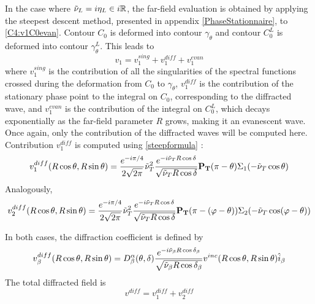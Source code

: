 In the case where $\tilde{\nu}_L=i\eta_L \in i\mathbb{R}$, the far-field evaluation is obtained by applying the steepest descent method, presented in appendix \ref{PhaseStationnaire}, to \eqref{C4:v1C0evan}. Contour $C_0$ is deformed into contour $\gamma_{\theta}$ and contour $C_0^L$ is deformed into contour $\gamma_{\theta}^L$. This leads to
\begin{equation}
v_1=v_1^{sing}+v_1^{diff}+v_1^{evan}
\end{equation}
where $v_1^{sing}$ is the contribution of all the singularities of the spectral functions crossed during the deformation from $C_0$ to $\gamma_{\theta}$, $v_1^{diff}$ is the contribution of the stationary phase point to the integral on $C_0$, corresponding to the diffracted wave, and $v_1^{evan}$ is the contribution of the integral on $C_0^L$, which decays exponentially as the far-field parameter $R$ grows, making it an evanescent wave. Once again, only the contribution of the diffracted waves will be computed here. Contribution $v_1^{diff}$ is computed using \eqref{steepformula} :
\begin{equation}
v_1^{diff}(R\cos\theta,R\sin\theta)=\frac{e^{-i\pi/4}}{2\sqrt{2\pi}}\tilde{\nu}_T^2\frac{e^{-i\tilde{\nu}_TR\cos\delta}}{\sqrt{\tilde{\nu}_TR\cos\delta}}\mathbf{P_T}(\pi-\theta)\Sigma_1(-\tilde{\nu}_T\cos\theta)
\end{equation}
Analogously,
\begin{equation}
v_2^{diff}(R\cos\theta,R\sin\theta)=\frac{e^{-i\pi/4}}{2\sqrt{2\pi}}\tilde{\nu}_T^2\frac{e^{-i\tilde{\nu}_TR\cos\delta}}{\sqrt{\tilde{\nu}_TR\cos\delta}}\mathbf{P_T}(\pi-(\varphi-\theta))\Sigma_2(-\tilde{\nu}_T\cos(\varphi-\theta))
\end{equation}

In both cases, the diffraction coefficient is defined by
\begin{equation}
v_{\beta}^{diff}(R\cos\theta,R\sin\theta)=D_{\beta}^{\alpha}(\theta,\delta)\frac{e^{-i\tilde{\nu}_{\beta}R\cos\delta_{\beta}}}{\sqrt{\tilde{\nu}_{\beta}R\cos\delta_{\beta}}} v^{inc}(R\cos\theta,R\sin\theta) \hat{i}_{\beta}
\label{C4:coeffdiff}
\end{equation}
The total diffracted field is
\begin{equation}
v^{diff}=v_1^{diff}+v_2^{diff}
\end{equation}

